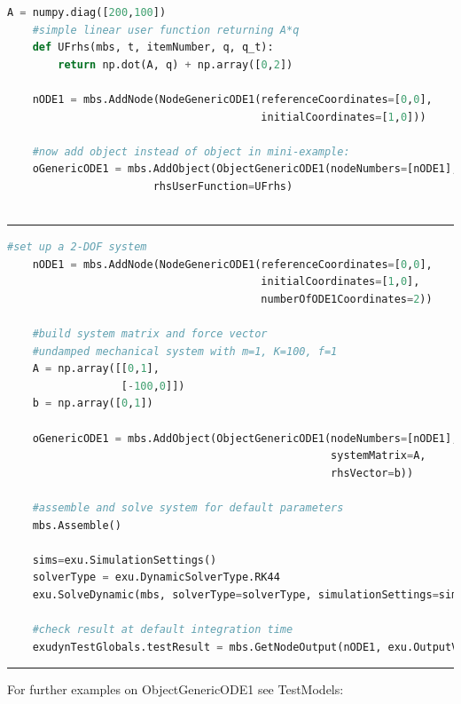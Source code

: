     \userFunctionExample{}
    \pythonstyle
    \begin{lstlisting}[language=Python]
    A = numpy.diag([200,100])
    #simple linear user function returning A*q
    def UFrhs(mbs, t, itemNumber, q, q_t): 
        return np.dot(A, q) + np.array([0,2])
        
    nODE1 = mbs.AddNode(NodeGenericODE1(referenceCoordinates=[0,0],
                                        initialCoordinates=[1,0]))

    #now add object instead of object in mini-example:
    oGenericODE1 = mbs.AddObject(ObjectGenericODE1(nodeNumbers=[nODE1], 
                       rhsUserFunction=UFrhs)
                                 
    \end{lstlisting}
\vspace{6pt}\par\noindent\rule{\textwidth}{0.4pt}
\label{miniExample_ObjectGenericODE1}
\pythonstyle
\begin{lstlisting}[language=Python, firstnumber=1]
    #set up a 2-DOF system
    nODE1 = mbs.AddNode(NodeGenericODE1(referenceCoordinates=[0,0],
                                        initialCoordinates=[1,0],
                                        numberOfODE1Coordinates=2))

    #build system matrix and force vector
    #undamped mechanical system with m=1, K=100, f=1
    A = np.array([[0,1],
                  [-100,0]])
    b = np.array([0,1])
    
    oGenericODE1 = mbs.AddObject(ObjectGenericODE1(nodeNumbers=[nODE1], 
                                                   systemMatrix=A, 
                                                   rhsVector=b))
    
    #assemble and solve system for default parameters
    mbs.Assemble()
    
    sims=exu.SimulationSettings()
    solverType = exu.DynamicSolverType.RK44
    exu.SolveDynamic(mbs, solverType=solverType, simulationSettings=sims)

    #check result at default integration time
    exudynTestGlobals.testResult = mbs.GetNodeOutput(nODE1, exu.OutputVariableType.Coordinates)[0]

\end{lstlisting}

\vspace{6pt}\par\noindent\rule{\textwidth}{0.4pt}
%
\noindent For further examples on ObjectGenericODE1 see TestModels:
\bi
\item{}\ei

